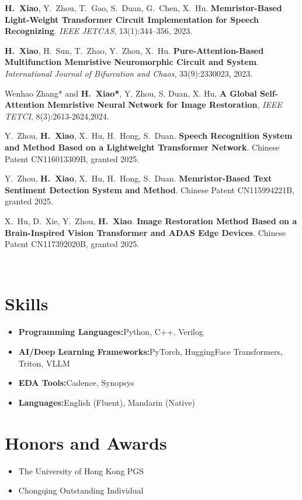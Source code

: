 \documentclass[a4paper,11pt]{article}
\newcommand{\resumeItem}[2]{
  \item{
    \textbf{#1}{\hspace{0.5mm}#2 \vspace{-0.5mm}}
  }
}
\newcommand{\resumeSubItem}[2]{\resumeItem{#1}{#2}\vspace{-4pt}}
\newcommand{\resumeHeadingSkillStart}{\begin{itemize}[leftmargin=*,itemsep=1.7mm, rightmargin=2ex]}
\newcommand{\resumeItemListStart}{\begin{itemize}[leftmargin=*,labelsep=1mm,itemsep=0.5mm]}
\newcommand{\resumeHeadingSkillEnd}{\end{itemize}\vspace{-2mm}}
\newcommand{\resumeItemListEnd}{\end{itemize}\vspace{-2mm}}
\begin{document}
{\begin{enumerate}[leftmargin=*, labelsep=0.5em, align=left, widest={\textbf{[P.3]}}, itemindent=0em]
\item[\textbf{[J.5]}] \textbf{H.~Xiao}, Y.~Zhou, T.~Gao, S.~Duan, G.~Chen, X.~Hu. \textbf{Memristor-Based Light-Weight Transformer Circuit Implementation for Speech Recognizing}. \textit{IEEE JETCAS}, 13(1):344--356, 2023.
\item[\textbf{[J.6]}] \textbf{H.~Xiao}, H.~Sun, T.~Zhao, Y.~Zhou, X.~Hu. \textbf{Pure-Attention-Based Multifunction Memristive Neuromorphic Circuit and System}. \textit{International Journal of Bifurcation and Chaos}, 33(9):2330023, 2023.
\item[\textbf{[J.7]}] Wenhao Zhang* and \textbf{H.~Xiao*}, Y. Zhou, S. Duan, X. Hu, \textbf{A Global Self-Attention Memristive Neural Network for Image Restoration}, \textit{IEEE TETCI}, 8(3):2613-2624,2024.
\item[\textbf{[P.1]}] Y.~Zhou, \textbf{H.~Xiao}, X.~Hu, H.~Hong, S.~Duan. \textbf{Speech Recognition System and Method Based on a Lightweight Transformer Network}. Chinese Patent CN116013309B, granted 2025.
\item[\textbf{[P.2]}] Y.~Zhou, \textbf{H.~Xiao}, X.~Hu, H.~Hong, S.~Duan. \textbf{Memristor-Based Text Sentiment Detection System and Method}. Chinese Patent CN115994221B, granted 2025.
\item[\textbf{[P.3]}] X.~Hu, D.~Xie, Y.~Zhou, \textbf{H.~Xiao}. \textbf{Image Restoration Method Based on a Brain-Inspired Vision Transformer and ADAS Edge Devices}. Chinese Patent CN117392020B, granted 2025.
\end{enumerate}}  \

\section{\textbf{Skills}}
\vspace{-0.4mm}
 \resumeHeadingSkillStart
  \resumeSubItem{Programming Languages:}{Python, C++, Verilog}
  \resumeSubItem{AI/Deep Learning Frameworks:}{PyTorch, HuggingFace Transformers, Triton, VLLM}
  \resumeSubItem{EDA Tools:}{Cadence, Synopsys}
  \resumeSubItem{Languages:}{English (Fluent), Mandarin (Native)}
 \resumeHeadingSkillEnd

\section{\textbf{Honors and Awards}}
\vspace{-0.4mm}
\resumeItemListStart
  \item{The University of Hong Kong PGS}
  \item{Chongqing Outstanding Individual}
\resumeItemListEnd
\end{document}
